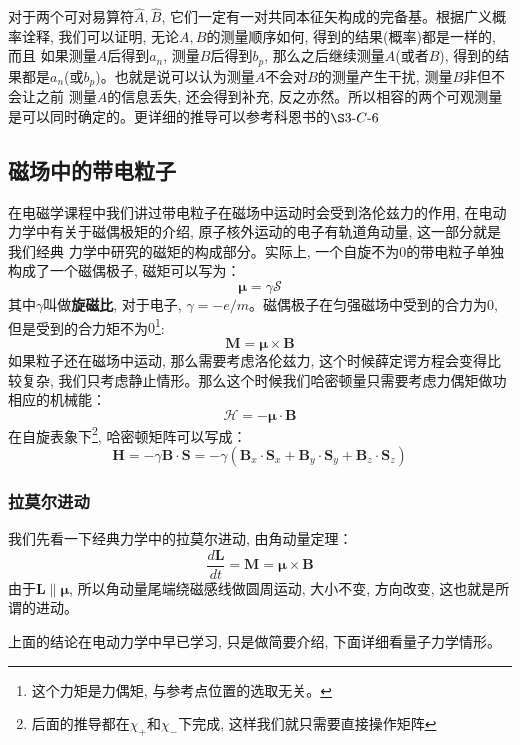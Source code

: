 \documentclass[a4paper,zihao=-4,linespread=1]{ctexrep}
\begin{document}
    对于两个可对易算符$\hat A,\hat B$, 它们一定有一对共同本征矢构成的完备基。根据广义概率诠释, 我们可以证明, 无论$A,B$的测量顺序如何, 得到的结果(概率)都是一样的, 而且
    如果测量$A$后得到$a_n$, 测量$B$后得到$b_p$, 那么之后继续测量$A$(或者$B$), 得到的结果都是$a_n$(或$b_p$)。也就是说可以认为测量$A$不会对$B$的测量产生干扰, 测量$B$非但不会让之前
    测量$A$的信息丢失, 还会得到补充, 反之亦然。所以相容的两个可观测量是可以同时确定的。更详细的推导可以参考科恩书的$\S3\mbox{-}C\mbox{-}6$
    
    \subsection{磁场中的带电粒子}
    在电磁学课程中我们讲过带电粒子在磁场中运动时会受到洛伦兹力的作用, 在电动力学中有关于磁偶极矩的介绍, 原子核外运动的电子有轨道角动量, 这一部分就是我们经典
    力学中研究的磁矩的构成部分。实际上, 一个自旋不为$0$的带电粒子单独构成了一个磁偶极子, 磁矩可以写为：
    \[\mathbf{\mu}=\gamma\mathcal{S}\]
    其中$\gamma$叫做\textbf{旋磁比}, 对于电子, $\gamma=-e/m$。磁偶极子在匀强磁场中受到的合力为$0$, 但是受到的合力矩不为$0$\footnote{这个力矩是力偶矩, 与参考点位置的选取无关。}:
    \[\mathbf{M}=\mathbf{\mu}\times\mathbf{B}\]
    如果粒子还在磁场中运动, 那么需要考虑洛伦兹力, 这个时候薛定谔方程会变得比较复杂, 我们只考虑静止情形。那么这个时候我们哈密顿量只需要考虑力偶矩做功相应的机械能：
    \[\mathcal{H}=-\mathbf{\mu}\cdot\mathbf{B}\]
    在自旋表象下\footnote{后面的推导都在$\chi_+$和$\chi_-$下完成, 这样我们就只需要直接操作矩阵}, 哈密顿矩阵可以写成：
    \[\mathbf{H}=-\gamma\mathbf{B}\cdot\mathbf{S}=-\gamma\left(\mathbf{B}_x\cdot\mathbf{S}_x+\mathbf{B}_y\cdot\mathbf{S}_y+\mathbf{B}_z\cdot\mathbf{S}_z\right)\]
    \subsubsection*{拉莫尔进动}
    我们先看一下经典力学中的拉莫尔进动, 由角动量定理：
    \begin{equation}
        \frac{d\mathbf{L}}{dt}=\mathbf{M}=\mathbf{\mu}\times\mathbf{B}
    \end{equation}
    由于$\mathbf{L}\parallel\mathbf{\mu}$, 所以角动量尾端绕磁感线做圆周运动, 大小不变, 方向改变, 这也就是所谓的进动。

    上面的结论在电动力学中早已学习, 只是做简要介绍, 下面详细看量子力学情形。
\end{document}
